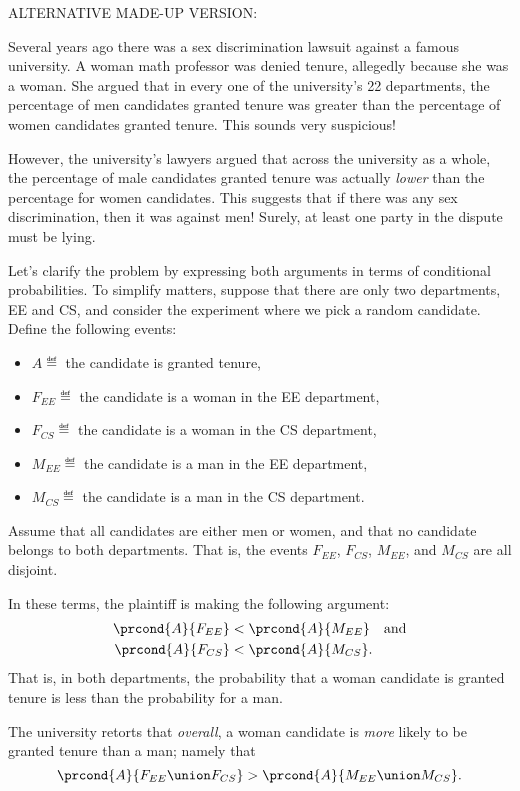 \begin{editingnotes}
ALTERNATIVE MADE-UP VERSION:

Several years ago there was a sex discrimination lawsuit against a
famous university.  A woman math professor was denied tenure,
allegedly because she was a woman.  She argued that in every one of
the university's 22 departments, the percentage of men candidates
granted tenure was greater than the percentage of women candidates
granted tenure.  This sounds very suspicious!

However, the university's lawyers argued that across the university as
a whole, the percentage of male candidates granted tenure was actually
\emph{lower} than the percentage for women candidates.  This suggests
that if there was any sex discrimination, then it was against men!
Surely, at least one party in the dispute must be lying.

Let's clarify the problem by expressing both arguments in terms of
conditional probabilities.  To simplify matters, suppose that there
are only two departments, EE and CS, and consider the experiment where
we pick a random candidate.  Define the following events:
%
\begin{itemize}
\item $A \eqdef$ the candidate is granted tenure,
\item $F_{EE} \eqdef$ the candidate is a woman in the EE department,
\item $F_{CS} \eqdef$ the candidate is a woman in the CS department,
\item $M_{EE} \eqdef$ the candidate is a man in the EE department,
\item $M_{CS} \eqdef$ the candidate is a man in the CS department.
\end{itemize}

Assume that all candidates are either men or women, and that no
candidate belongs to both departments.  That is, the events $F_{EE}$,
$F_{CS}$, $M_{EE}$, and $M_{CS}$ are all disjoint.

In these terms, the plaintiff is making the following argument:
%
\begin{align*}
\prcond{A}{F_{EE}} & < \prcond{A}{M_{EE}} \quad\text{and}\\
\prcond{A}{F_{CS}} & < \prcond{A}{M_{CS}}.
\end{align*}
That is, in both departments, the probability that a woman candidate
is granted tenure is less than the probability for a man.

The university retorts that \emph{overall}, a woman candidate is
\emph{more} likely to be granted tenure than a man; namely that
\[
    \prcond{A}{F_{EE} \union F_{CS}} > \prcond{A}{M_{EE} \union M_{CS}}.
\]


\end{editingnotes}
